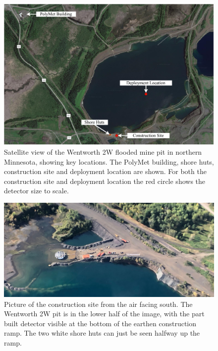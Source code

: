 \begin{figure} %
    \includegraphics[width=\textwidth]{diagrams/4-chips/pit.pdf}
    \caption[Satellite view of the Wentworth 2W mine pit, with key locations.]
    {Satellite view of the Wentworth 2W flooded mine pit in northern Minnesota, showing key
        \chipsfive locations. The PolyMet building, shore huts, construction site and deployment
        location are shown. For both the construction site and deployment location the red circle
        shows the \chipsfive detector size to scale.}
    \label{fig:pit}
\end{figure}

\begin{figure} %
    \includegraphics[width=\textwidth]{diagrams/4-chips/from_the_air.jpeg}
    \caption[Picture of the \chipsfive construction site from the air.]
    {Picture of the \chipsfive construction site from the air facing south. The Wentworth 2W pit
        is in the lower half of the image, with the part built \chipsfive detector visible at the
        bottom of the earthen construction ramp. The two white shore huts can just be seen halfway
        up the ramp.}
    \label{fig:from_the_sky}
\end{figure}

